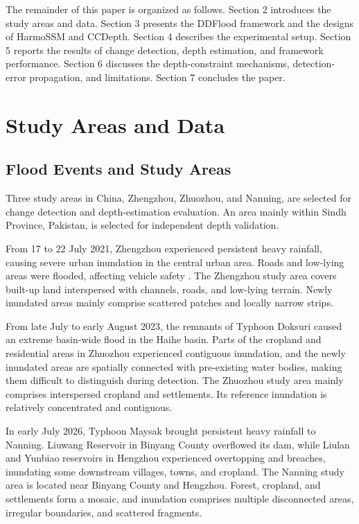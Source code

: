\documentclass[authoryear,preprint,12pt]{elsarticle}
\begin{document}
The remainder of this paper is organized as follows. Section 2 introduces the study areas and data. Section 3 presents the DDFlood framework and the designs of HarmoSSM and CCDepth. Section 4 describes the experimental setup. Section 5 reports the results of change detection, depth estimation, and framework performance. Section 6 discusses the depth-constraint mechanisms, detection-error propagation, and limitations. Section 7 concludes the paper.

\section{Study Areas and Data}

\subsection{Flood Events and Study Areas}

Three study areas in China, Zhengzhou, Zhuozhou, and Nanning, are selected for change detection and depth-estimation evaluation. An area mainly within Sindh Province, Pakistan, is selected for independent depth validation.

From 17 to 22 July 2021, Zhengzhou experienced persistent heavy rainfall, causing severe urban inundation in the central urban area. Roads and low-lying areas were flooded, affecting vehicle safety \citep{dong2022urbanrisk}. The Zhengzhou study area covers built-up land interspersed with channels, roads, and low-lying terrain. Newly inundated areas mainly comprise scattered patches and locally narrow strips.

From late July to early August 2023, the remnants of Typhoon Doksuri caused an extreme basin-wide flood in the Haihe basin. Parts of the cropland and residential areas in Zhuozhou experienced contiguous inundation, and the newly inundated areas are spatially connected with pre-existing water bodies, making them difficult to distinguish during detection. The Zhuozhou study area mainly comprises interspersed cropland and settlements. Its reference inundation is relatively concentrated and contiguous.

In early July 2026, Typhoon Maysak brought persistent heavy rainfall to Nanning. Liuwang Reservoir in Binyang County overflowed its dam, while Liulan and Yunbiao reservoirs in Hengzhou experienced overtopping and breaches, inundating some downstream villages, towns, and cropland. The Nanning study area is located near Binyang County and Hengzhou. Forest, cropland, and settlements form a mosaic, and inundation comprises multiple disconnected areas, irregular boundaries, and scattered fragments.
\end{document}
